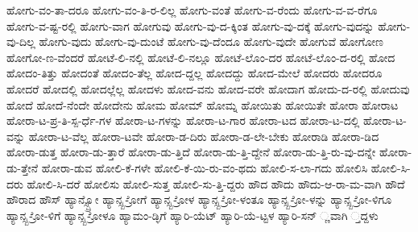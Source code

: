{ಹೋಗು-ವಂ-ತಾ-ದರೂ
ಹೋಗು-ವಂ-ತಿ-ರ-ಲಿಲ್ಲ
ಹೋಗು-ವಂತೆ
ಹೋಗು-ವ-ರೆಂದು
ಹೋಗು-ವ-ವ-ರೆಗೂ
ಹೋಗು-ವ-ಷ್ಟ-ರಲ್ಲಿ
ಹೋಗು-ವಾಗ
ಹೋಗುವು
ಹೋಗು-ವು-ದ-ಕ್ಕಿಂತ
ಹೋಗು-ವು-ದಕ್ಕೆ
ಹೋಗು-ವುದನ್ನು
ಹೋಗು-ವು-ದಿಲ್ಲ
ಹೋಗು-ವುದು
ಹೋಗು-ವು-ದುಂಟೆ
ಹೋಗು-ವು-ದೆಂದೂ
ಹೋಗು-ವುದೇ
ಹೋಗುವೆ
ಹೋಗೋಣ
ಹೋಗೋ-ಣ-ವೆಂದರೆ
ಹೋಟೆ-ಲಿ-ನಲ್ಲಿ
ಹೋಟೆ-ಲಿ-ನಲ್ಲೂ
ಹೋಟೆ-ಲೊಂ-ದರ
ಹೋಟೆ-ಲೊಂ-ದ-ರಲ್ಲಿ
ಹೋದ
ಹೋದಂ-ತಿತ್ತು
ಹೋದಂತೆ
ಹೋದಂ-ತೆಲ್ಲ
ಹೋದ-ದ್ದಲ್ಲ
ಹೋದದ್ದು
ಹೋದ-ಮೇಲೆ
ಹೋದರು
ಹೋದರೂ
ಹೋದರೆ
ಹೋದಲ್ಲಿ
ಹೋದಲ್ಲೆಲ್ಲ
ಹೋದಳು
ಹೋದ-ವನು
ಹೋದ-ವರೇ
ಹೋದಾಗ
ಹೋದು-ದ-ರಲ್ಲಿ
ಹೋದುವು
ಹೋದೆ
ಹೋದೆ-ನೆಂದೇ
ಹೋದೇನು
ಹೋಮ
ಹೋಮ್
ಹೋಮ್ನ
ಹೋಯಿತು
ಹೋಯಿತೇ
ಹೋರಾ
ಹೋರಾಟ
ಹೋರಾ-ಟ-ಪ್ರ-ತಿ-ಸ್ಪ-ರ್ಧೆ-ಗಳ
ಹೋರಾ-ಟ-ಗಳನ್ನು
ಹೋರಾ-ಟ-ಗಾರ
ಹೋರಾ-ಟದ
ಹೋರಾ-ಟ-ದಲ್ಲಿ
ಹೋರಾ-ಟ-ವನ್ನು
ಹೋರಾ-ಟ-ವೆಲ್ಲ
ಹೋರಾ-ಟವೇ
ಹೋರಾ-ಡ-ದಿರು
ಹೋರಾ-ಡ-ಲೇ-ಬೇಕು
ಹೋರಾಡಿ
ಹೋರಾ-ಡಿದ
ಹೋರಾ-ಡುತ್ತ
ಹೋರಾ-ಡು-ತ್ತಾರೆ
ಹೋರಾ-ಡು-ತ್ತಿದೆ
ಹೋರಾ-ಡು-ತ್ತಿ-ದ್ದೇನೆ
ಹೋರಾ-ಡು-ತ್ತಿ-ರು-ವು-ದನ್ನೇ
ಹೋರಾ-ಡು-ತ್ತೇನೆ
ಹೋರಾ-ಡುವ
ಹೋಲಿ-ಕೆ-ಗಳೇ
ಹೋಲಿ-ಕೆ-ಯಿ-ರು-ವಂ-ಥದು
ಹೋಲಿ-ಸ-ಲಾ-ಗದು
ಹೋಲಿಸಿ
ಹೋಲಿ-ಸಿ-ದರು
ಹೋಲಿ-ಸಿ-ದರೆ
ಹೋಲಿಸು
ಹೋಲಿ-ಸುತ್ತ
ಹೋಲಿ-ಸು-ತ್ತಿ-ದ್ದರು
ಹೌದ
ಹೌದು
ಹೌದು-ಆ-ರಾ-ಮ-ವಾಗಿ
ಹೌದೆ
ಹೌರಾದ
ಹೌಸ್
ಹ್ಯಾನ್ಸ್ಬ್ರೋ
ಹ್ಯಾನ್ಸ್ಬ-್ರೋಗೆ
ಹ್ಯಾನ್ಸ್ಬ-್ರೋಳ
ಹ್ಯಾನ್ಸ್ಬ-್ರೋ-ಳಂತೂ
ಹ್ಯಾನ್ಸ್ಬ-್ರೋ-ಳನ್ನು
ಹ್ಯಾನ್ಸ್ಬ-್ರೋ-ಳಿಗೂ
ಹ್ಯಾನ್ಸ್ಬ-್ರೋ-ಳಿಗೆ
ಹ್ಯಾನ್ಸ್ಬ-್ರೋಳೂ
ಹ್ಯಾಮಂ-ಡ್ಳಿಗೆ
ಹ್ಯಾರಿ-ಯೆಟ್
ಹ್ಯಾರಿ-ಯೆ-ಟ್ಟಳ
ಹ್ಯಾರಿ-ಸನ್
್ಣವಾಗಿ
್ತದ್ದಳು
}
